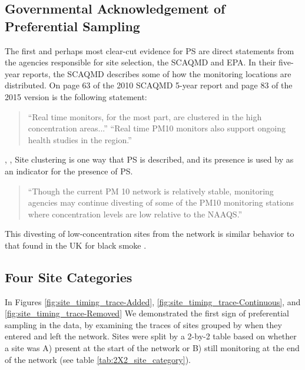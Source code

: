 \documentclass{article}
\begin{document}
\subsection{Governmental Acknowledgement of Preferential Sampling} \label{subsec:govPrefSamp}
The first and perhaps most clear-cut evidence for \ac{PS} are direct statements from the agencies responsible for site selection, the \ac{SCAQMD} and \ac{EPA}.  In their five-year reports, the \ac{SCAQMD} describes some of how the monitoring locations are distributed.  On page 63 of the 2010 \ac{SCAQMD} 5-year report and page 83 of the 2015 version is the following statement:
\begin{quote}
  ``Real time monitors, for the most part, are clustered in the high concentration areas...''  ``Real time \ac{PM10} monitors also support ongoing health studies in the region.''    
\end{quote} \cite{CASCAQMD:2010}, \cite{CASCAQMD:2015}, \cite{AQMNP:2019}
Site clustering is one way that \ac{PS} is described, and its presence is used by \cite{watson2020} as an indicator for the presence of \ac{PS}. 

\begin{quote}
    ``Though the current PM 10 network is relatively stable, monitoring agencies may  continue divesting of some of the PM10 monitoring stations where concentration levels are low relative to the NAAQS.''
\end{quote} \cite{EPA:IntegratedReview}
This divesting of low-concentration sites from the network is similar behavior to that found in the UK for black smoke \citep{zidek2010monitoring}.

\subsection{Four Site Categories}\label{sec:4sitecategories}
In Figures \ref{fig:site_timing_trace-Added}, \ref{fig:site_timing_trace-Continuous}, and \ref{fig:site_timing_trace-Removed} We demonstrated the first sign of preferential sampling in the data, by examining the traces of sites grouped by when they entered and left the network.  Sites were split by a 2-by-2 table based on whether a site was A) present at the start of the network or B) still monitoring at the end of the network (see table \ref{tab:2X2_site_category}).
\end{document}

